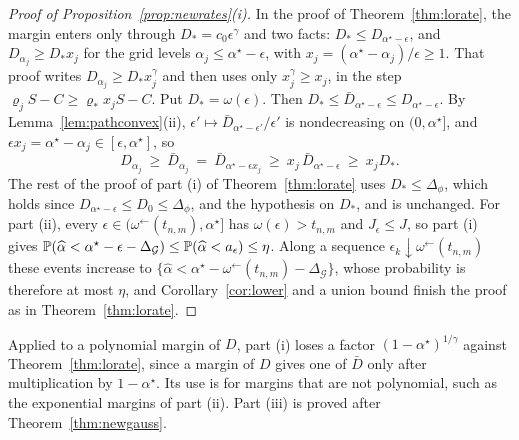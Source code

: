\begin{proof}[Proof of Proposition~\ref{prop:newrates}(i)]
In the proof of Theorem~\ref{thm:lorate}, the margin enters only through $D_*=c_0\epsilon^\gamma$ and two facts: $D_*\le
D_{\alpha^\star-\epsilon}$, and $D_{\alpha_j}\ge D_*x_j$ for the grid levels $\alpha_j\le\alpha^\star-\epsilon$, with
$x_j=(\alpha^\star-\alpha_j)/\epsilon\ge1$. That proof writes $D_{\alpha_j}\ge D_*x_j^\gamma$ and then uses only
$x_j^\gamma\ge x_j$, in the step $\varrho_jS-C\ge\varrho_*x_jS-C$. Put $D_*=\omega(\epsilon)$. Then
$D_*\le \bar D_{\alpha^\star-\epsilon}\le D_{\alpha^\star-\epsilon}$. By Lemma~\ref{lem:pathconvex}(ii), $\epsilon'\mapsto
\bar D_{\alpha^\star-\epsilon'}/\epsilon'$ is nondecreasing on $(0,\alpha^\star]$, and $\epsilon x_j=\alpha^\star-\alpha_j\in[\epsilon,\alpha^\star]$,
so
\[
D_{\alpha_j}\ \ge\ \bar D_{\alpha_j}\ =\ \bar D_{\alpha^\star-\epsilon x_j}\ \ge\ x_j\,\bar D_{\alpha^\star-\epsilon}\ \ge\ x_jD_* .
\]
The rest of the proof of part (i) of Theorem~\ref{thm:lorate} uses $D_*\le\Delta_\phi$, which holds since
$D_{\alpha^\star-\epsilon}\le D_0\le\Delta_\phi$, and the hypothesis on $D_*$, and is unchanged. For part (ii), every
$\epsilon\in(\omega^{\leftarrow}(t_{n,m}),\alpha^\star]$ has $\omega(\epsilon)>t_{n,m}$ and $J_\epsilon\le J$, so part (i) gives
$\mathbb{P}(\widehat\alpha<\alpha^\star-\epsilon-\Delta_{\mathcal G})\le\mathbb{P}(\widehat\alpha<a_\epsilon)\le\eta$. Along a sequence
$\epsilon_k\downarrow\omega^{\leftarrow}(t_{n,m})$ these events increase to
$\{\widehat\alpha<\alpha^\star-\omega^{\leftarrow}(t_{n,m})-\Delta_{\mathcal G}\}$, whose probability is therefore at most $\eta$, and
Corollary~\ref{cor:lower} and a union bound finish the proof as in Theorem~\ref{thm:lorate}.
\end{proof}

Applied to a polynomial margin of $D$, part (i) loses a factor $(1-\alpha^\star)^{1/\gamma}$ against
Theorem~\ref{thm:lorate}, since a margin of $D$ gives one of $\bar D$ only after multiplication by $1-\alpha^\star$. Its use is
for margins that are not polynomial, such as the exponential margins of part (ii). Part (iii) is proved after
Theorem~\ref{thm:newgauss}.

